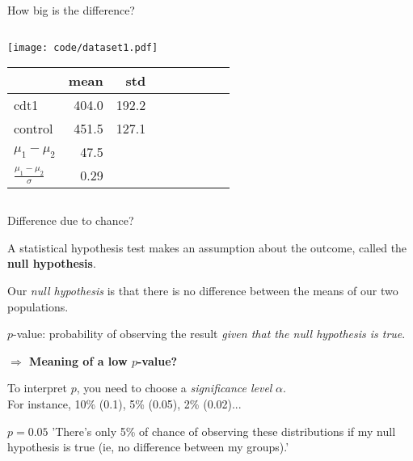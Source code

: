\documentclass[compress]{beamer}
\begin{document}
\begin{frame}{How big is the difference?}
\begin{columns}
\begin{column}{0.33\linewidth}
{                \texttt{[image: code/dataset1.pdf]}

            \begin{center}
                \tiny
                \begin{tabular}{lrrrrrrrr}
                    \toprule
                    {} &  mean &         std\\ \midrule
                    cdt1      &   404.0 & 192.2 \\
                    control   &   451.5 & 127.1\\ \midrule
                    $\mu_1 - \mu_2$ & 47.5 & \only<5->{\\
                    $\frac{\mu_1 - \mu_2}{\sigma}$ & 0.29 &} \\
                    \bottomrule
                \end{tabular}
            \end{center}
        }

        \end{column}
    \end{columns}



\end{frame}

\begin{frame}{Difference due to chance?}

    A statistical hypothesis test makes an assumption about the outcome, called
    the \textbf{null hypothesis}.

    Our \emph{null hypothesis} is that there is no difference between the means
    of our two populations.

    \pause

    $p$-value: probability of observing the result \emph{given that the null hypothesis is true}.

    \begin{center}\bf $\Rightarrow$ Meaning of a low $p$-value? \end{center}

    \pause

    To interpret $p$, you need to choose a \emph{significance level} $\alpha$.\\
    For instance, 10\% (0.1), 5\% (0.05), 2\% (0.02)...

    \begin{exampleblock}{$p=0.05$}
        'There's only 5\% of chance of observing these distributions if my null
        hypothesis is true (ie, no difference between my groups).'
    \end{exampleblock}

\end{frame}
\end{document}
